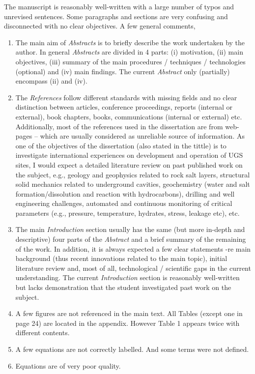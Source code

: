 \documentclass[14pt,twoside]{report}
\begin{document}
The manuscript is reasonably well-written with a large number of typos and unrevised sentences. Some paragraphs and sections are very confusing and disconnected with no clear objectives. A few general comments,
\begin{enumerate}
%
\item The main aim of {\it Abstracts} is to briefly describe the work undertaken by the author. In general {\it Abstracts} are divided in 4 parts: (i) motivation, (ii) main objectives, (iii) summary of the main procedures / techniques / technologies (optional) and (iv) main findings. The current {\it Abstract} only (partially) encompass (ii) and (iv).
%
\item The {\it References} follow different standards with missing fields and no clear distinction between articles, conference proceedings, reports (internal or external), book chapters, books, communications (internal or external) etc.  Additionally, most of the references used in the dissertation are from web-pages -- which are usually considered as unreliable source of information. As one of the objectives of the dissertation (also stated in the tittle) is to investigate international experiences on development and operation of UGS sites, I would expect a detailed literature review on past published work on the subject, e.g., geology and geophysics related to rock salt layers, structural solid mechanics related to underground cavities, geochemistry (water and salt formation/dissolution and reaction with hydrocarbons), drilling and well engineering challenges, automated and continuous monitoring of critical parameters (e.g., pressure, temperature, hydrates, stress, leakage etc), etc.  
%
\item The main {\it Introduction} section usually has the same (but more in-depth and descriptive) four parts of the {\it Abstract} and a brief summary of the remaining of the work. In addition, it is always expected a few clear statements -re main background (thus recent innovations related to the main topic), initial literature review and, most of all, technological / scientific gaps in the current understanding. The current {\it Introduction} section is reasonably well-written but lacks demonstration that the student investigated past work on the subject.
%
\item A few figures are not referenced in the main text. All Tables (except one in page 24) are located in the appendix. However Table 1 appears twice with different contents.
%
\item A few equations are not correctly labelled. And some terms were not defined.
%
\item Equations are of very poor quality.
%
\end{enumerate}
\end{document}
